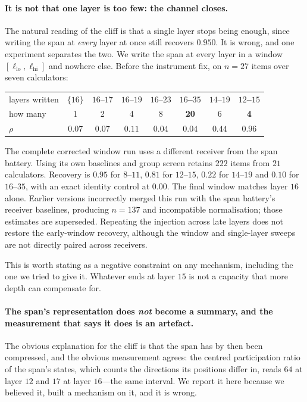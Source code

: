 \documentclass{article}
\begin{document}
\paragraph{It is not that one layer is too few: the channel closes.} The
natural reading of the cliff is that a single layer stops being enough, since
writing the span at \emph{every} layer at once still recovers $0.950$. It is
wrong, and one experiment separates the two. We write the span at every layer in
a window $[\ell_{\text{lo}}, \ell_{\text{hi}}]$ and nowhere else. Before the
instrument fix, on $n=27$ items over seven calculators:

\begin{center}
\begin{tabular}{@{}lccccccc@{}}
\toprule
layers written & $\{16\}$ & $16$--$17$ & $16$--$19$ & $16$--$23$ &
\textbf{$16$--$35$} & $14$--$19$ & \textbf{$12$--$15$} \\
how many & 1 & 2 & 4 & 8 & \textbf{20} & 6 & \textbf{4} \\
\midrule
$\rho$ & $0.07$ & $0.07$ & $0.11$ & $0.04$ & $\mathbf{0.04}$ & $0.44$ &
$\mathbf{0.96}$ \\
\bottomrule
\end{tabular}
\end{center}

The complete corrected window run uses a different receiver from the span
battery. Using its own baselines and group screen retains $222$ items from
$21$ calculators. Recovery is $0.95$ for $8$--$11$, $0.81$ for $12$--$15$,
$0.22$ for $14$--$19$ and $0.10$ for $16$--$35$, with an exact identity
control at $0.00$. The final window matches layer $16$ alone. Earlier versions
incorrectly merged this run with the span battery's receiver baselines,
producing $n=137$ and incompatible normalisation; those estimates are
superseded. Repeating the injection across late layers does not restore the
early-window recovery, although the window and single-layer sweeps are not
directly paired across receivers.

This is worth stating as a negative constraint on any mechanism, including the
one we tried to give it. Whatever ends at layer $15$ is not a capacity that more
depth can compensate for.

\paragraph{The span's representation does \emph{not} become a summary, and the
measurement that says it does is an artefact.} The obvious explanation for the
cliff is that the span has by then been compressed, and the obvious measurement
agrees: the centred participation ratio of the span's states, which counts the
directions its positions differ in, reads $64$ at layer $12$ and $17$ at layer
$16$---the same interval. We report it here because we believed it, built a
mechanism on it, and it is wrong.
\end{document}
